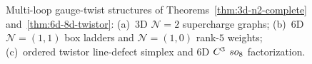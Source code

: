 \begin{figure}[H]
\caption{Multi-loop gauge-twist structures of Theorems~\ref{thm:3d-n2-complete} and~\ref{thm:6d-8d-twistor}: (a)~$3\mathrm{D}$ $\mathcal{N}=2$ supercharge graphs; (b)~$6\mathrm{D}$ $\mathcal{N}=(1,1)$ box ladders and $\mathcal{N}=(1,0)$ rank-$5$ weights; (c)~ordered twistor line-defect simplex and $6\mathrm{D}$ $C^3$ $so_8$ factorization.}
\label{fig:3d-6d-gauge}
\end{figure}
